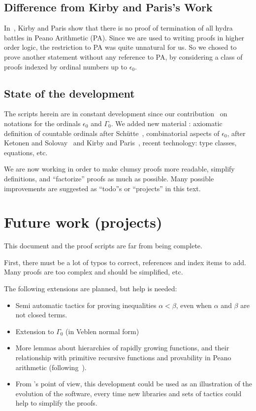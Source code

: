 
\subsection*{Difference from Kirby and Paris's Work}
In~\cite{KP82}, Kirby and Paris show  that there is no proof of termination of all hydra battles in Peano Arithmetic (PA).
Since we are used to writing proofs in higher order logic, the restriction to PA was quite unnatural for us. So we chosed to prove another statement without any reference to PA, by considering a class of proofs indexed by ordinal numbers up to $\epsilon_0$.

\subsection*{State of the development}
The \coq{} scripts herein are in constant development since our contribution~\cite{CantorContrib} on  notations for the ordinals $\epsilon_0$ and $\Gamma_0$.
We added new material : axiomatic definition of countable ordinals after Schütte~\cite{schutte}, combinatorial aspects of $\epsilon_0$, after Ketonen and Solovay~\cite{KS81} and Kirby and Paris~\cite{KP82}, recent \coq{} technology: type classes, equations, etc.

We are now working in order to make clumsy proofs more readable, simplify definitions, and ``factorize'' proofs as much as possible. 
Many possible improvements are suggested as ``todo''s or ``projects'' in this text.


\section*{Future work (projects)}

This document and the proof scripts are far from being complete.

First, there must be a lot of typos to correct, references and index items to add. Many proofs are too complex and should be simplified, etc.

The following extensions are planned, but help is needed:

\begin{itemize}
\item Semi automatic tactics for proving inequalities $\alpha < \beta$, even when $\alpha$ and $\beta$ are not closed terms.
\item Extension to $\Gamma_0$ (in Veblen normal form)
\item More lemmas about hierarchies of rapidly growing functions, and their relationship 
    with primitive recursive functions and provability in Peano arithmetic 
(following~\cite{KS81, KP82}).
\item From \coq's point of view, this development could be used as an illustration of the evolution of the software, every time new libraries and sets of tactics could help to simplify the proofs.
\end{itemize}

